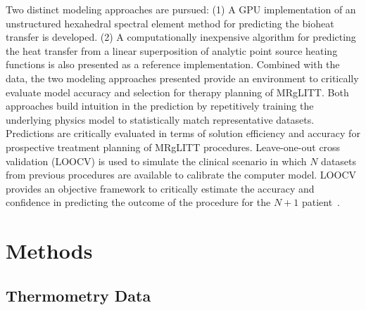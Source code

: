 \documentclass[12pt]{article}
\begin{document}
Two distinct modeling approaches are pursued: 
(1) A GPU implementation of an unstructured hexahedral spectral element method
for predicting the bioheat transfer is developed. 
(2) A computationally inexpensive algorithm for predicting the heat transfer
from a linear superposition of analytic point source heating functions is also
presented as a reference implementation.
{\color{red}
Combined with the data, the two modeling approaches presented provide an
environment to critically evaluate model accuracy and  selection for therapy
planning of MRgLITT. 
}
Both approaches 
build intuition in the prediction by
repetitively training the underlying physics model 
to statistically match representative datasets. 
Predictions are critically evaluated in terms of solution efficiency and
accuracy for prospective treatment planning of MRgLITT procedures. 
Leave-one-out cross validation (LOOCV) is used to simulate the clinical
scenario in which $N$ datasets from previous procedures are available to
calibrate the computer model. LOOCV provides an objective framework to
critically estimate the accuracy and confidence in predicting the outcome
of the procedure for the $N+1$ patient~\cite{Stone1974,Geisser1975,Kohavi1995,Browne2000,Arlot2010}.

\section{Methods }
\subsection{Thermometry Data }\label{ThermometryData}
\end{document}
